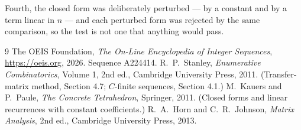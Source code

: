 \documentclass[11pt,a4paper]{article}
\theoremstyle{plain}
\theoremstyle{definition}
\begin{document}
Fourth, the closed form was deliberately perturbed --- by a constant and by a term linear in
$n$ --- and each perturbed form was rejected by the same comparison, so the test is not one
that anything would pass.

\begin{thebibliography}{9}
 The OEIS Foundation, \emph{The On-Line Encyclopedia of Integer
Sequences}, \url{https://oeis.org}, 2026. Sequence A224414.
 R.~P.~Stanley, \emph{Enumerative Combinatorics}, Volume 1, 2nd ed.,
Cambridge University Press, 2011. (Transfer-matrix method, Section 4.7; $C$-finite sequences,
Section 4.1.)
 M.~Kauers and P.~Paule, \emph{The Concrete Tetrahedron}, Springer, 2011.
(Closed forms and linear recurrences with constant coefficients.)
 R.~A.~Horn and C.~R.~Johnson, \emph{Matrix Analysis}, 2nd ed., Cambridge
University Press, 2013.
\end{thebibliography}
\end{document}
